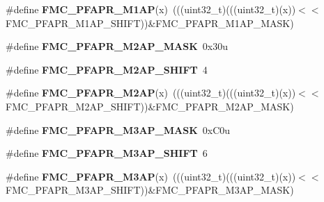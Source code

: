 \begin{DoxyCompactItemize}
\item 
\#define {\bfseries F\+M\+C\+\_\+\+P\+F\+A\+P\+R\+\_\+\+M1\+AP}(x)~(((uint32\+\_\+t)(((uint32\+\_\+t)(x))$<$$<$F\+M\+C\+\_\+\+P\+F\+A\+P\+R\+\_\+\+M1\+A\+P\+\_\+\+S\+H\+I\+FT))\&F\+M\+C\+\_\+\+P\+F\+A\+P\+R\+\_\+\+M1\+A\+P\+\_\+\+M\+A\+SK)\hypertarget{group__FMC__Register__Masks_gad2184109a8267fe065c175e7121dc572}{}\label{group__FMC__Register__Masks_gad2184109a8267fe065c175e7121dc572}

\item 
\#define {\bfseries F\+M\+C\+\_\+\+P\+F\+A\+P\+R\+\_\+\+M2\+A\+P\+\_\+\+M\+A\+SK}~0x30u\hypertarget{group__FMC__Register__Masks_gab3e23f648e34da06b351ac745476f30c}{}\label{group__FMC__Register__Masks_gab3e23f648e34da06b351ac745476f30c}

\item 
\#define {\bfseries F\+M\+C\+\_\+\+P\+F\+A\+P\+R\+\_\+\+M2\+A\+P\+\_\+\+S\+H\+I\+FT}~4\hypertarget{group__FMC__Register__Masks_ga05f65455021f093de56e9e086f7185ee}{}\label{group__FMC__Register__Masks_ga05f65455021f093de56e9e086f7185ee}

\item 
\#define {\bfseries F\+M\+C\+\_\+\+P\+F\+A\+P\+R\+\_\+\+M2\+AP}(x)~(((uint32\+\_\+t)(((uint32\+\_\+t)(x))$<$$<$F\+M\+C\+\_\+\+P\+F\+A\+P\+R\+\_\+\+M2\+A\+P\+\_\+\+S\+H\+I\+FT))\&F\+M\+C\+\_\+\+P\+F\+A\+P\+R\+\_\+\+M2\+A\+P\+\_\+\+M\+A\+SK)\hypertarget{group__FMC__Register__Masks_ga625b34ad30829e1f89f056738b94bcff}{}\label{group__FMC__Register__Masks_ga625b34ad30829e1f89f056738b94bcff}

\item 
\#define {\bfseries F\+M\+C\+\_\+\+P\+F\+A\+P\+R\+\_\+\+M3\+A\+P\+\_\+\+M\+A\+SK}~0x\+C0u\hypertarget{group__FMC__Register__Masks_gae2347dc5794bb1de5793cd2a1c31854f}{}\label{group__FMC__Register__Masks_gae2347dc5794bb1de5793cd2a1c31854f}

\item 
\#define {\bfseries F\+M\+C\+\_\+\+P\+F\+A\+P\+R\+\_\+\+M3\+A\+P\+\_\+\+S\+H\+I\+FT}~6\hypertarget{group__FMC__Register__Masks_gacb37659011a95dffc2216ccedfafb212}{}\label{group__FMC__Register__Masks_gacb37659011a95dffc2216ccedfafb212}

\item 
\#define {\bfseries F\+M\+C\+\_\+\+P\+F\+A\+P\+R\+\_\+\+M3\+AP}(x)~(((uint32\+\_\+t)(((uint32\+\_\+t)(x))$<$$<$F\+M\+C\+\_\+\+P\+F\+A\+P\+R\+\_\+\+M3\+A\+P\+\_\+\+S\+H\+I\+FT))\&F\+M\+C\+\_\+\+P\+F\+A\+P\+R\+\_\+\+M3\+A\+P\+\_\+\+M\+A\+SK)\hypertarget{group__FMC__Register__Masks_ga958e56a4db58fd1840e7460f611af1fa}{}\label{group__FMC__Register__Masks_ga958e56a4db58fd1840e7460f611af1fa}


\end{DoxyCompactItemize}
